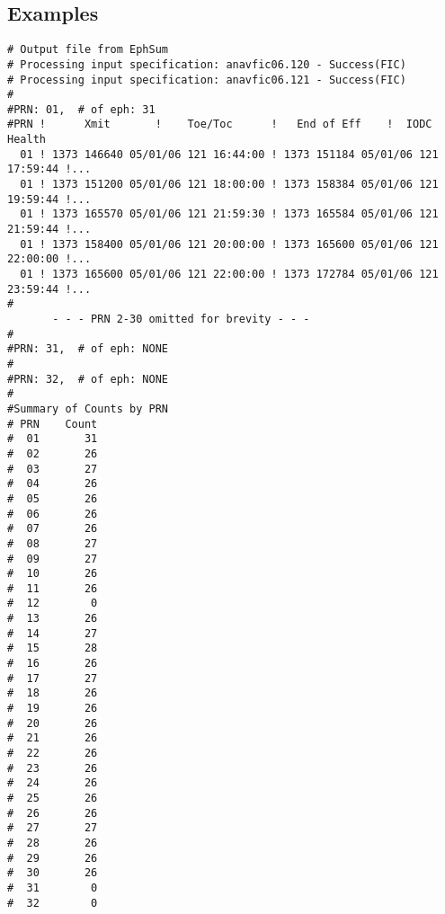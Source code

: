 \documentclass{article}
\begin{document}
\subsection{Examples}
\begin{verbatim}
# Output file from EphSum
# Processing input specification: anavfic06.120 - Success(FIC)
# Processing input specification: anavfic06.121 - Success(FIC)
#
#PRN: 01,  # of eph: 31
#PRN !      Xmit       !    Toe/Toc      !   End of Eff    !  IODC   Health
  01 ! 1373 146640 05/01/06 121 16:44:00 ! 1373 151184 05/01/06 121 17:59:44 !... 
  01 ! 1373 151200 05/01/06 121 18:00:00 ! 1373 158384 05/01/06 121 19:59:44 !...
  01 ! 1373 165570 05/01/06 121 21:59:30 ! 1373 165584 05/01/06 121 21:59:44 !...
  01 ! 1373 158400 05/01/06 121 20:00:00 ! 1373 165600 05/01/06 121 22:00:00 !...
  01 ! 1373 165600 05/01/06 121 22:00:00 ! 1373 172784 05/01/06 121 23:59:44 !...
#
       - - - PRN 2-30 omitted for brevity - - -
#
#PRN: 31,  # of eph: NONE
#
#PRN: 32,  # of eph: NONE
#
#Summary of Counts by PRN
# PRN    Count
#  01       31
#  02       26
#  03       27
#  04       26
#  05       26
#  06       26
#  07       26
#  08       27
#  09       27
#  10       26
#  11       26
#  12        0
#  13       26
#  14       27
#  15       28
#  16       26
#  17       27
#  18       26
#  19       26
#  20       26
#  21       26
#  22       26
#  23       26
#  24       26
#  25       26
#  26       26
#  27       27
#  28       26
#  29       26
#  30       26
#  31        0
#  32        0
\end{verbatim}
\end{document}
